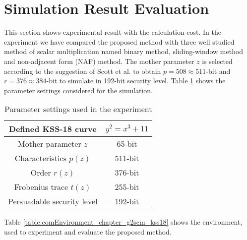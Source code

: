 \section{Simulation Result Evaluation}
This section shows experimental result with the calculation cost.
 In the experiment we have compared the proposed method with three well studied method of scalar multiplication named binary method, sliding-window method and non-adjacent form (NAF) method. 
The mother parameter $z$ is  selected according to the suggestion of Scott et al. \cite{IMA:Scott11} to obtain $p = 508 \approx 511$-bit and $r =  376 \approx 384$-bit  to simulate in 192-bit security level.
Table \ref{table:parameters_chapter_g2scm_kss18} shows the parameter settings considered for the simulation.

\renewcommand{\baselinestretch}{1.5}
\begin{table}[htb]
	\begin{center}
		\caption{Parameter settings used in the experiment}
		\begin{tabular}{|c|c|}
			\hline
			Defined KSS-18 curve & $y^2 = x^3 + 11$ \\ \hline
			Mother parameter $z$ & 65-bit \\ \hline
			Characteristics  $p(z)$ & 511-bit \\ \hline
			Order  $r(z)$ & 376-bit \\ \hline
			Frobenius trace $t(z)$ & 255-bit \\ \hline
			Persuadable security level & 192-bit \\ \hline
		\end{tabular}
		\label{table:parameters_chapter_g2scm_kss18}
	\end{center}
\end{table}
\renewcommand{\baselinestretch}{1.0}

Table \ref{table:comEnvironment_chapter_g2scm_kss18} shows the environment, used to experiment and evaluate the proposed method.  
\renewcommand{\baselinestretch}{1.5}
\begin{table}[!ht]
\renewcommand{\arraystretch}{1.3}
\centering
\caption{ Computational Environment}
\label{table:comEnvironment_chapter_g2scm_kss18}
\end{table}
\renewcommand{\baselinestretch}{1.0}

